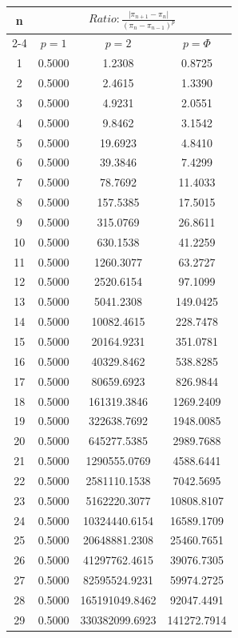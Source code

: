 \documentclass{article}
\providecommand{\abs}[1]{\lvert#1\rvert}
\begin{document}
\begin{tabular}{|c|c|c|c|}
\hline
\multirow{2}{*}{n} & \multicolumn{3}{|c|}{$Ratio:\displaystyle\frac{\abs{\pi_{n+1}-\pi_{n}}}{({\pi_{n}-\pi_{n-1}})^p}$} \\
\cline{2-4}
 & $p=1$ & $p=2$ & $p=\Phi$ \\
\hline
 1 & 0.5000 & 1.2308 & 0.8725 \\ 
  2 & 0.5000 & 2.4615 & 1.3390 \\ 
  3 & 0.5000 & 4.9231 & 2.0551 \\ 
  4 & 0.5000 & 9.8462 & 3.1542 \\ 
  5 & 0.5000 & 19.6923 & 4.8410 \\ 
  6 & 0.5000 & 39.3846 & 7.4299 \\ 
  7 & 0.5000 & 78.7692 & 11.4033 \\ 
  8 & 0.5000 & 157.5385 & 17.5015 \\ 
  9 & 0.5000 & 315.0769 & 26.8611 \\ 
 10 & 0.5000 & 630.1538 & 41.2259 \\ 
 11 & 0.5000 & 1260.3077 & 63.2727 \\ 
 12 & 0.5000 & 2520.6154 & 97.1099 \\ 
 13 & 0.5000 & 5041.2308 & 149.0425 \\ 
 14 & 0.5000 & 10082.4615 & 228.7478 \\ 
 15 & 0.5000 & 20164.9231 & 351.0781 \\ 
 16 & 0.5000 & 40329.8462 & 538.8285 \\ 
 17 & 0.5000 & 80659.6923 & 826.9844 \\ 
 18 & 0.5000 & 161319.3846 & 1269.2409 \\ 
 19 & 0.5000 & 322638.7692 & 1948.0085 \\ 
 20 & 0.5000 & 645277.5385 & 2989.7688 \\ 
 21 & 0.5000 & 1290555.0769 & 4588.6441 \\ 
 22 & 0.5000 & 2581110.1538 & 7042.5695 \\ 
 23 & 0.5000 & 5162220.3077 & 10808.8107 \\ 
 24 & 0.5000 & 10324440.6154 & 16589.1709 \\ 
 25 & 0.5000 & 20648881.2308 & 25460.7651 \\ 
 26 & 0.5000 & 41297762.4615 & 39076.7305 \\ 
 27 & 0.5000 & 82595524.9231 & 59974.2725 \\ 
 28 & 0.5000 & 165191049.8462 & 92047.4491 \\ 
 29 & 0.5000 & 330382099.6923 & 141272.7914 \\ 
 \hline 
\end{tabular}
\end{document}
